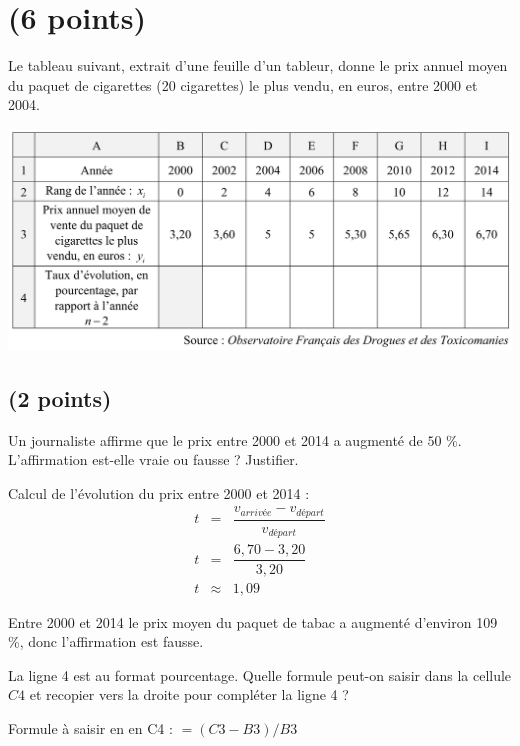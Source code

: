 \section{(6 points)}

Le tableau suivant, extrait d'une feuille d'un tableur, donne le prix annuel moyen du paquet de cigarettes (20 cigarettes) le plus vendu, en euros, entre 2000 et 2004.

\begin{center}
	\includegraphics[scale=0.4]{img/tabac}
\end{center}

\subsection{(2 points)}

\begin{questions}
	\question[1] Un journaliste affirme que le prix entre 2000 et 2014 a augmenté de $50$ \%. L'affirmation est-elle vraie ou fausse ? Justifier.
	\begin{solution}
		Calcul de l'évolution du prix entre 2000 et 2014 :
		\begin{eqnarray*}
			t &=& \dfrac{v_{arrivée} - v_{départ}}{v_{départ}} \\
			t &=& \dfrac{6,70 - 3,20}{3,20} \\
			t &\approx& 1,09
		\end{eqnarray*}
	
	Entre 2000 et 2014 le prix moyen du paquet de tabac a augmenté d'environ 109 \%, donc l'affirmation est fausse.
	\end{solution}
	\question[1] La ligne 4 est au format pourcentage. Quelle formule peut-on saisir dans la cellule $C4$ et recopier vers la droite pour compléter la ligne 4 ?
	\begin{solution}
		Formule à saisir en en C4 :
		$=(C3-B3)/B3$
	\end{solution}
\end{questions}

